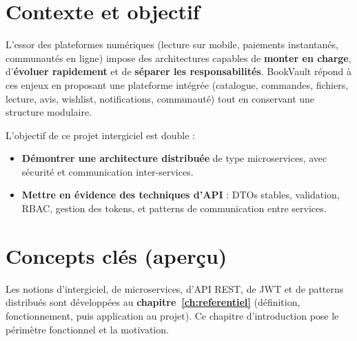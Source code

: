 \documentclass[12pt,a4paper]{report}
\begin{document}
\section{Contexte et objectif}
L'essor des plateformes numériques (lecture sur mobile, paiements instantanés, communautés en ligne) impose des architectures capables de \textbf{monter en charge}, d'\textbf{évoluer rapidement} et de \textbf{séparer les responsabilités}. BookVault répond à ces enjeux en proposant une plateforme intégrée (catalogue, commandes, fichiers, lecture, avis, wishlist, notifications, communauté) tout en conservant une structure modulaire.\par

L'objectif de ce projet intergiciel est double :
\begin{itemize}
  \item \textbf{Démontrer une architecture distribuée} de type microservices, avec sécurité et communication inter-services.
  \item \textbf{Mettre en évidence des techniques d'API} : DTOs stables, validation, RBAC, gestion des tokens, et patterns de communication entre services.
\end{itemize}

\section{Concepts clés (aperçu)}
Les notions d'intergiciel, de microservices, d'API REST, de JWT et de patterns distribués sont développées au \textbf{chapitre~\ref{ch:referentiel}} (définition, fonctionnement, puis application au projet). Ce chapitre d'introduction pose le périmètre fonctionnel et la motivation.\par
\end{document}
